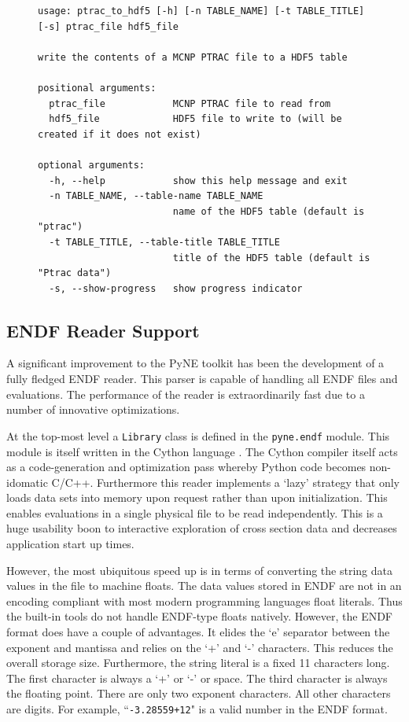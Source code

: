 \documentclass{anstrans}
\begin{document}
\begin{figure}[htbp]
\begin{lstlisting}[frame=single,basicstyle=\scriptsize\ttfamily,label=fig_ptractohdf5,caption=Usage description of the PTRAC to HDF5 command line utility.]
usage: ptrac_to_hdf5 [-h] [-n TABLE_NAME] [-t TABLE_TITLE] [-s] ptrac_file hdf5_file

write the contents of a MCNP PTRAC file to a HDF5 table

positional arguments:
  ptrac_file            MCNP PTRAC file to read from
  hdf5_file             HDF5 file to write to (will be created if it does not exist)

optional arguments:
  -h, --help            show this help message and exit
  -n TABLE_NAME, --table-name TABLE_NAME
                        name of the HDF5 table (default is "ptrac")
  -t TABLE_TITLE, --table-title TABLE_TITLE
                        title of the HDF5 table (default is "Ptrac data")
  -s, --show-progress   show progress indicator
\end{lstlisting}
\end{figure}

\subsection{ENDF Reader Support}

A significant improvement to the PyNE toolkit has been the development of 
a fully fledged ENDF \cite{herman2009endf} reader.  This parser is capable 
of handling all ENDF files and evaluations. The performance of the reader is 
extraordinarily fast due to a number of innovative optimizations.

At the top-most level a \texttt{Library} class is defined in the \texttt{pyne.endf}
module.  This module is itself written in the Cython language \cite{behnel2010cython}.
The Cython compiler itself acts as a code-generation and optimization pass whereby
Python code becomes non-idomatic C/C++.  Furthermore this reader implements a
`lazy' strategy that only loads data sets into memory upon request rather 
than upon initialization.  This enables evaluations in a single physical file to be 
read independently.  This is a huge usability boon to interactive exploration of 
cross section data and decreases application start up times.

However, the most ubiquitous speed up is in terms of converting the string
data values in the file to machine floats.  The data values stored in ENDF 
are not in an encoding compliant with
most modern programming languages float literals. Thus the built-in tools do not 
handle ENDF-type floats natively.  However, the ENDF format does have a couple
of advantages.  It elides the `e' separator between the exponent and mantissa and
relies on the `+' and `-' characters.  This reduces the overall storage size.
Furthermore, the string literal is a fixed 11 characters long. The first character
is always a `+' or `-' or space.  The third character is always the floating point.
There are only two exponent characters. All other characters are digits.  
For example, ``\texttt{-3.28559+12}" is a valid number in the ENDF format.
\end{document}
